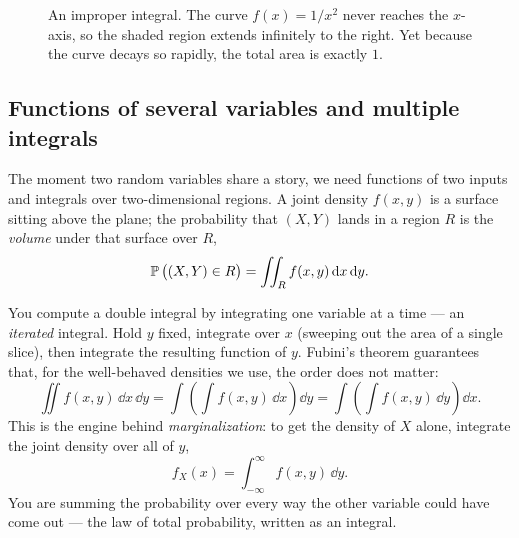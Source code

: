 \begin{figure}[htbp]
\centering
{}
\caption{An improper integral. The curve $f(x)=1/x^2$ never reaches the $x$-axis, so the shaded region extends infinitely to the right. Yet because the curve decays so rapidly, the total area is exactly $1$.}
\label{chAcla:fig-improper}
\end{figure}

\subsection{Functions of several variables and multiple integrals}
\label{chAcla:multiple-integrals}

The moment two random variables share a story, we need functions of two inputs and integrals over
two-dimensional regions. A joint density $f(x,y)$ is a surface sitting above the plane; the
probability that $(X,Y)$ lands in a region $R$ is the \emph{volume} under that surface over $R$,
\[
  \operatorname{\mathbb{P}}\big((X,Y)\in R\big) = \iint_R f(x,y)\,\mathrm{d} x\,\mathrm{d} y.
\]

You compute a double integral by integrating one variable at a time --- an \emph{iterated} integral.
Hold $y$ fixed, integrate over $x$ (sweeping out the area of a single slice), then integrate the
resulting function of $y$. Fubini's theorem guarantees that, for the well-behaved densities we use,
the order does not matter:
\[ \iint f(x,y)\,\dd x\,\dd y = \int \left(\int f(x,y)\,\dd x\right)\dd y = \int \left(\int f(x,y)\,\dd y\right)\dd x. \]
This is the engine
behind \emph{marginalization}: to get the density of $X$ alone, integrate the joint density over all
of $y$,
\[ f_X(x) = \int_{-\infty}^{\infty} f(x,y)\,\dd y. \]
You are summing the probability over every way
the other variable could have come out --- the law of total probability, written as an integral.

